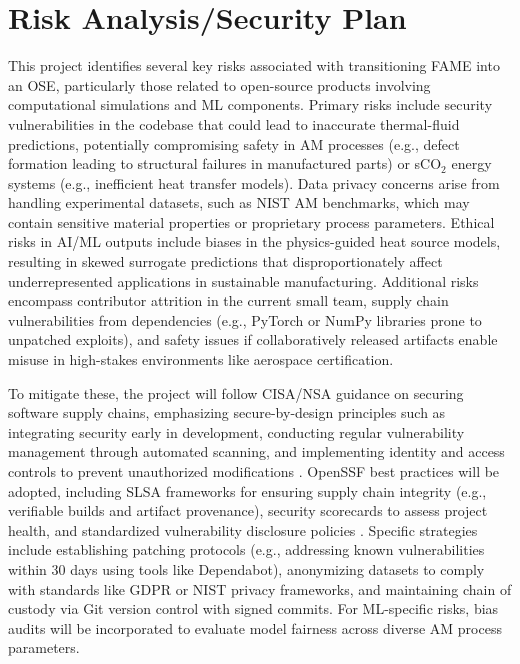 \documentclass[11pt]{article}
\begin{document}
\section*{Risk Analysis/Security Plan}
\vspace{-3pt}
\noindent
This project identifies several key risks associated with transitioning FAME into an OSE, particularly those related to open-source products involving computational simulations and ML components. Primary risks include security vulnerabilities in the codebase that could lead to inaccurate thermal-fluid predictions, potentially compromising safety in AM processes (e.g., defect formation leading to structural failures in manufactured parts) or sCO$_2$ energy systems (e.g., inefficient heat transfer models). Data privacy concerns arise from handling experimental datasets, such as NIST AM benchmarks, which may contain sensitive material properties or proprietary process parameters. Ethical risks in AI/ML outputs include biases in the physics-guided heat source models, resulting in skewed surrogate predictions that disproportionately affect underrepresented applications in sustainable manufacturing. Additional risks encompass contributor attrition in the current small team, supply chain vulnerabilities from dependencies (e.g., PyTorch or NumPy libraries prone to unpatched exploits), and safety issues if collaboratively released artifacts enable misuse in high-stakes environments like aerospace certification.

To mitigate these, the project will follow CISA/NSA guidance on securing software supply chains, emphasizing secure-by-design principles such as integrating security early in development, conducting regular vulnerability management through automated scanning, and implementing identity and access controls to prevent unauthorized modifications \cite{souppayaSecureSoftwareDevelopment2022}. OpenSSF best practices will be adopted, including SLSA frameworks for ensuring supply chain integrity (e.g., verifiable builds and artifact provenance), security scorecards to assess project health, and standardized vulnerability disclosure policies \cite{SLSAOpenSource}. Specific strategies include establishing patching protocols (e.g., addressing known vulnerabilities within 30 days using tools like Dependabot), anonymizing datasets to comply with standards like GDPR or NIST privacy frameworks, and maintaining chain of custody via Git version control with signed commits. For ML-specific risks, bias audits will be incorporated to evaluate model fairness across diverse AM process parameters.
\end{document}
